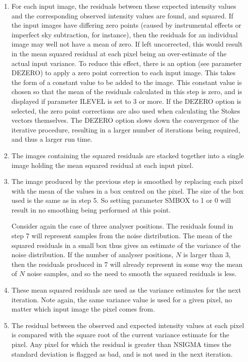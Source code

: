\documentclass[twoside,11pt]{article}
\renewcommand{\_}{\texttt{\symbol{95}}}
\begin{document}
\begin{enumerate}
\item For each input image, the residuals between these expected intensity 
values and the corresponding observed intensity values are found, and
squared. If the input images have differing zero points (caused by
instrumental effects or imperfect sky subtraction, for instance), then
the residuals for an individual image may well not have a mean of zero.
If left uncorrected, this would result in the mean squared residual at
each pixel being an over-estimate of the actual input variance. To reduce
this effect, there is an option (see parameter DEZERO) to apply a zero
point correction to each input image. This takes the form of a constant
value to be added to the image. This constant value is chosen so that the
mean of the residuals calculated in this step is zero, and is displayed
if parameter ILEVEL is set to 3 or more. If the DEZERO option is
selected, the zero point corrections are also used when calculating the
Stokes vectors themselves. The DEZERO option slows down the convergence
of the iterative procedure, resulting in a larger number of iterations
being required, and thus a larger run time. 

\item The images containing the squared residuals are stacked together
into a single image holding the mean squared residual at each input pixel.

\item The image produced by the previous step is smoothed by replacing
each pixel with the mean of the values in a box centred on the pixel.
The size of the box used is the same as in step 5. So setting
parameter SMBOX to 1 or 0 will result in no smoothing being performed
at this point.

Consider again the case of three analyser positions. The residuals found in
step 7 will represent samples from the noise distribution. The
mean of the squared residuals in a small box thus gives an estimate of the 
variance of the noise distribution. If the number of analyser positions,
$N$ is larger than 3, then the residuals produced in 7 will already
represent in some way the mean of $N$ noise samples, and so the need to
smooth the squared residuals is less. 

\item These mean squared residuals are used as the variance estimates
for the next iteration. Note again, the same variance value is used for
a given pixel, no matter which input image the pixel comes from.

\item The residual between the observed and expected intensity values at
each pixel is compared with the square root of the current variance estimate 
for the pixel. Any pixel for which the residual is greater than NSIGMA
times the standard deviation is flagged as bad, and is not used in the
next iteration.


\end{enumerate}
\end{document}
